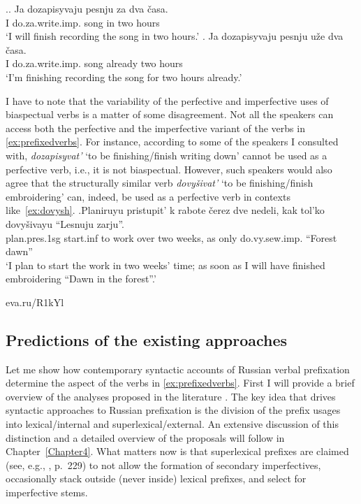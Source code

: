 \ex.\label{ex:2pref}\ag. \label{ex:2preftel}Ja dozapisyvaju pesnju za dva \v{c}asa.\\
I do.za.write.imp. song in two hours\\
\vspace{0.5em}
`I will finish recording the song in two hours.'
\bg. \label{ex:2prefatel}Ja dozapisyvaju pesnju u\v{z}e dva \v{c}asa.\\
I do.za.write.imp. song already two hours\\
\vspace{0.5em}
`I'm finishing recording the song for two hours already.'

I have to note that the variability of the perfective and imperfective uses of biaspectual verbs is a matter of some disagreement. Not all the speakers can access both the perfective and the imperfective variant of the verbs in \ref{ex:prefixedverbs}. For instance, according to some of the speakers I consulted with, \textit{dozapisyvat'} `to be finishing/finish writing down' cannot be used as a perfective verb, i.e., it is not biaspectual. However, such speakers would also agree that the structurally similar verb \textit{dovy\v{s}ivat'} `to be finishing/finish embroidering' can, indeed, be used as a perfective verb in contexts like~\ref{ex:dovysh}.
\exg.\label{ex:dovysh}Planiruyu pristupit' k rabote \v{c}erez dve nedeli, kak tol'ko dovy\v{s}ivayu ``Lesnuju zarju''.\\
plan.pres.1sg start.inf to work over two weeks, as only do.vy.sew.imp. ``Forest dawn''\\
\vspace{0.5em}
`I plan to start the work in two weeks' time; as soon as I will have finished embroidering ``Dawn in the forest''.'
\begin{flushright}
\vspace{-0.5em}
eva.ru/R1kYl
\end{flushright}

\subsection{Predictions of the existing approaches}\label{subsection:bi:predictions}
Let me show how contemporary syntactic accounts of Russian verbal prefixation determine the aspect of the verbs in \ref{ex:prefixedverbs}. First I will provide a brief overview of the analyses proposed in the literature \citep{Ramchand:04, Svenonius:04a, Svenonius:04b, Romanova:06, Tatevosov:07, Tatevosov:09}. The key idea that drives syntactic approaches to Russian prefixation is the division of the prefix usages into lexical/internal and superlexical/external. An extensive discussion of this distinction and a detailed overview of the proposals will follow in Chapter~\ref{Chapter4}. What matters now is that superlexical prefixes are claimed (see, e.g., \citealt{Svenonius:04b}, p.~229) to not allow the formation of secondary imperfectives, occasionally stack outside (never inside) lexical prefixes, and select for imperfective stems.

